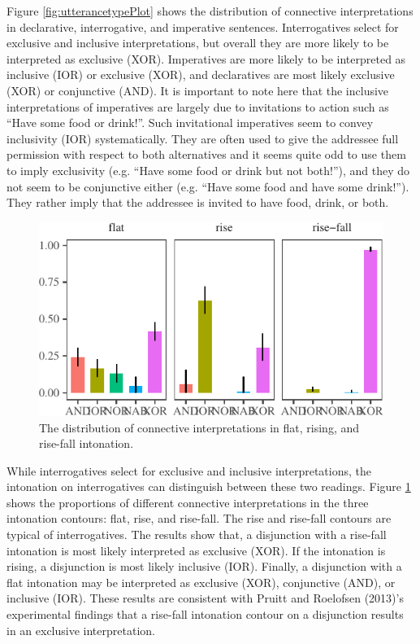 \documentclass[floatsintext,man]{apa6}
\theoremstyle{definition}
\theoremstyle{definition}
\theoremstyle{definition}
\theoremstyle{remark}
\begin{document}
Figure \ref{fig:utterancetypePlot} shows the distribution of connective
interpretations in declarative, interrogative, and imperative sentences.
Interrogatives select for exclusive and inclusive interpretations, but
overall they are more likely to be interpreted as exclusive (XOR).
Imperatives are more likely to be interpreted as inclusive (IOR) or
exclusive (XOR), and declaratives are most likely exclusive (XOR) or
conjunctive (AND). It is important to note here that the inclusive
interpretations of imperatives are largely due to invitations to action
such as \enquote{Have some food or drink!}. Such invitational
imperatives seem to convey inclusivity (IOR) systematically. They are
often used to give the addressee full permission with respect to both
alternatives and it seems quite odd to use them to imply exclusivity
(e.g. \enquote{Have some food or drink but not both!}), and they do not
seem to be conjunctive either (e.g. \enquote{Have some food and have
some drink!}). They rather imply that the addressee is invited to have
food, drink, or both.

\begin{figure}[tb]

{\centering \includegraphics{figs/intonationPlot-1} 

}

\caption{The distribution of connective interpretations in flat, rising, and rise-fall intonation.}\label{fig:intonationPlot}
\end{figure}

While interrogatives select for exclusive and inclusive interpretations,
the intonation on interrogatives can distinguish between these two
readings. Figure \ref{fig:intonationPlot} shows the proportions of
different connective interpretations in the three intonation contours:
flat, rise, and rise-fall. The rise and rise-fall contours are typical
of interrogatives. The results show that, a disjunction with a rise-fall
intonation is most likely interpreted as exclusive (XOR). If the
intonation is rising, a disjunction is most likely inclusive (IOR).
Finally, a disjunction with a flat intonation may be interpreted as
exclusive (XOR), conjunctive (AND), or inclusive (IOR). These results
are consistent with Pruitt and Roelofsen (2013)'s experimental findings
that a rise-fall intonation contour on a disjunction results in an
exclusive interpretation.
\end{document}
